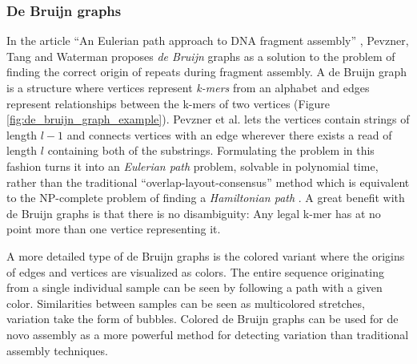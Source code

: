 \documentclass[thesis.tex]{subfiles}
\begin{document}
\subsubsection{De Bruijn graphs}
\label{sec:de_bruijn_graphs}
In the article ``An Eulerian path approach to DNA fragment assembly'' \cite{an_eulerian_path_approach_to_dna_fragment_assembly}, Pevzner, Tang and Waterman proposes \textit{de Bruijn} graphs as a solution to the problem of finding the correct origin of repeats during fragment assembly. A de Bruijn graph is a structure where vertices represent \textit{k-mers} from an alphabet and edges represent relationships between the k-mers of two vertices (Figure \ref{fig:de_bruijn_graph_example}). Pevzner et al. lets the vertices contain strings of length $l-1$ and connects vertices with an edge wherever there exists a read of length $l$ containing both of the substrings. Formulating the problem in this fashion turns it into an \textit{Eulerian path} problem, solvable in polynomial time, rather than the traditional ``overlap-layout-consensus'' method which is equivalent to the NP-complete problem of finding a \textit{Hamiltonian path} \cite[Section 11.1]{algorithms_sequential_parallell_and_distributed}. A great benefit with de Bruijn graphs is that there is no disambiguity: Any legal k-mer has at no point more than one vertice representing it.\\
\par\noindent
A more detailed type of de Bruijn graphs is the colored variant where the origins of edges and vertices are visualized as colors. The entire sequence originating from a single individual sample can be seen by following a path with a given color. Similarities between samples can be seen as multicolored stretches, variation take the form of bubbles. Colored de Bruijn graphs can be used for de novo assembly as a more powerful method for detecting variation than traditional assembly techniques\cite{de_novo_assembly_and_genotyping_of_variants_using_colored_de_bruijn_graphs}.
\end{document}

